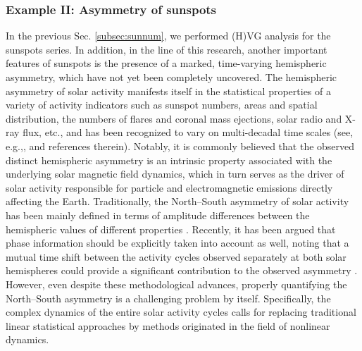 		\subsubsection{Example II: Asymmetry of sunspots} \label{subsec:sunspotsAsym}
		In the previous Sec. \ref{subsec:sunnum}, we performed (H)VG analysis for the sunspots series. In addition, in the line of this research, another important features of sunspots is the presence of a marked, time-varying hemispheric asymmetry, which have not yet been completely uncovered. The hemispheric asymmetry of solar activity manifests itself in the statistical properties of a variety of activity indicators such as sunspot numbers, areas and spatial distribution, the numbers of flares and coronal mass ejections, solar radio and X-ray flux, etc., and has been recognized to vary on multi-decadal time scales (see, e.g.,\cite{Newton1955,Carbonell1993,zolotova2006,donner2007,donner2008a,Li2008MNRAS,li2008a,zolotova2009}, and references therein). Notably, it is commonly believed that the observed distinct hemispheric asymmetry is an intrinsic property associated with the underlying solar magnetic field dynamics, which in turn serves as the driver of solar activity responsible for particle and electromagnetic emissions directly affecting the Earth. Traditionally, the North--South asymmetry of solar activity has been mainly defined in terms of amplitude differences between the hemispheric values of different properties \cite{Newton1955}. Recently, it has been argued that phase information should be explicitly taken into account as well, noting that a mutual time shift between the activity cycles observed separately at both solar hemispheres could provide a significant contribution to the observed asymmetry \cite{zolotova2006,donner2007}. However, even despite these methodological advances, properly quantifying the North--South asymmetry is a challenging problem by itself. Specifically, the complex dynamics of the entire solar activity cycles calls for replacing traditional linear statistical approaches by methods originated in the field of nonlinear dynamics.

